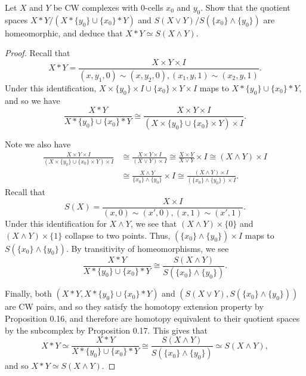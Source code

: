 \documentclass[12pt]{article}
\theoremstyle{remark}
\begin{document}
\setcounter{subsubsection}{23}
\begin{problem}
  Let $X$ and $Y$ be CW complexes with $0$-cells $x_0$ and $y_0$. Show that the quotient spaces $X \ast Y/(X \ast \{y_0\} \cup \{x_0\} \ast Y)$ and $S(X \vee Y)/S(\{x_0\} \wedge \{y_0\})$ are homeomorphic, and deduce that $X \ast Y \simeq S(X \wedge Y)$.
\end{problem}
\begin{proof}
  Recall that
  \begin{equation*}
    X \ast Y = \frac{X \times Y \times I}{(x,y_1,0) \sim (x,y_2,0), (x_1,y,1)\sim(x_2,y,1)}.
  \end{equation*}
  Under this identification, $X \times \{y_0\} \times I \cup \{x_0\} \times Y \times I$ maps to $X \ast \{y_0\} \cup \{x_0\} \ast Y$, and so we have
  \begin{equation*}
    \frac{X \ast Y}{X \ast \{y_0\} \cup \{x_0\} \ast Y} \cong \frac{X \times Y \times I}{(X \times \{y_0\} \cup \{x_0\} \times Y) \times I}.
  \end{equation*}
  \par Note we also have
  \begin{align*}
    \frac{X \times Y \times I}{(X \times \{y_0\} \cup \{x_0\} \times Y) \times I} &\cong \frac{X \times Y \times I}{(X \vee Y) \times I}
    \cong \frac{X \times Y}{X \vee Y} \times I \cong (X \wedge Y) \times I\\
    &\cong \frac{X \wedge Y}{\{x_0\} \wedge \{y_0\}} \times I \cong \frac{(X \wedge Y) \times I}{(\{x_0\} \wedge \{y_0\}) \times I}.
  \end{align*}
  Recall that
  \begin{equation*}
    S(X) = \frac{X \times I}{(x,0) \sim (x',0), (x,1) \sim (x',1)}.
  \end{equation*}
  Under this identification for $X \wedge Y$, we see that $(X \wedge Y) \times \{0\}$ and $(X \wedge Y) \times \{1\}$ collapse to two points. Thus, $(\{x_0\} \wedge \{y_0\}) \times I$ maps to $S(\{x_0\} \wedge \{y_0\})$. By transitivity of homeomorphisms, we see
  \begin{equation*}
    \frac{X \ast Y}{X \ast \{y_0\} \cup \{x_0\} \ast Y} \cong \frac{S(X \wedge Y)}{S(\{x_0\} \wedge \{y_0\})}.
  \end{equation*}
  \par Finally, both $(X \ast Y,X \ast \{y_0\} \cup \{x_0\} \ast Y)$ and $(S(X \vee Y),S(\{x_0\} \wedge \{y_0\}))$ are CW pairs, and so they satisfy the homotopy extension property by Proposition 0.16, and therefore are homotopy equivalent to their quotient spaces by the subcomplex by Proposition 0.17. This gives that
  \begin{equation*}
    X \ast Y \simeq \frac{X \ast Y}{X \ast \{y_0\} \cup \{x_0\} \ast Y} \cong \frac{S(X \wedge Y)}{S(\{x_0\} \wedge \{y_0\})} \simeq S(X \wedge Y),
  \end{equation*}
  and so $X \ast Y \simeq S(X \wedge Y)$.
\end{proof}
\endgroup
\end{document}
